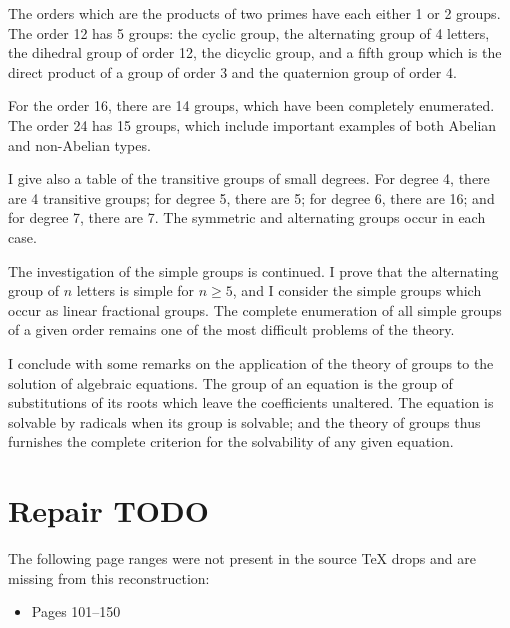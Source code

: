 \documentclass[11pt,a4paper]{book}
\begin{document}
The orders which are the products of two primes have each either 1 or 2 groups. The order 12 has 5 groups: the cyclic group, the alternating group of 4 letters, the dihedral group of order 12, the dicyclic group, and a fifth group which is the direct product of a group of order 3 and the quaternion group of order 4.

For the order 16, there are 14 groups, which have been completely enumerated. The order 24 has 15 groups, which include important examples of both Abelian and non-Abelian types.

I give also a table of the transitive groups of small degrees. For degree 4, there are 4 transitive groups; for degree 5, there are 5; for degree 6, there are 16; and for degree 7, there are 7. The symmetric and alternating groups occur in each case.

The investigation of the simple groups is continued. I prove that the alternating group of $n$ letters is simple for $n \ge 5$, and I consider the simple groups which occur as linear fractional groups. The complete enumeration of all simple groups of a given order remains one of the most difficult problems of the theory.

I conclude with some remarks on the application of the theory of groups to the solution of algebraic equations. The group of an equation is the group of substitutions of its roots which leave the coefficients unaltered. The equation is solvable by radicals when its group is solvable; and the theory of groups thus furnishes the complete criterion for the solvability of any given equation.
\clearpage


\clearpage
\section*{Repair TODO}
The following page ranges were not present in the source TeX drops and are missing from this reconstruction:
\begin{itemize}
\item Pages 101--150
\end{itemize}
\end{document}
